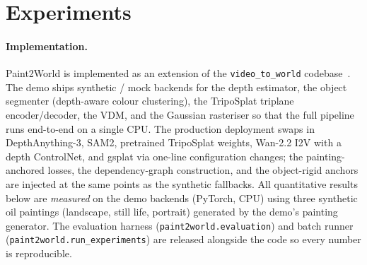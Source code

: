 
\section{Experiments}
\label{sec:experiments}

\paragraph{Implementation.}
Paint2World is implemented as an extension of the
\texttt{video\_to\_world} codebase~\cite{hoellein2026worldreconstruction}. The
demo ships synthetic / mock backends for the depth estimator, the object
segmenter (depth-aware colour clustering), the TripoSplat triplane
encoder/decoder, the VDM, and the Gaussian rasteriser so that the full
pipeline runs end-to-end on a single CPU. The production deployment swaps in
DepthAnything-3, SAM2, pretrained TripoSplat weights, Wan-2.2 I2V with a
depth ControlNet, and gsplat via one-line configuration changes; the
painting-anchored losses, the dependency-graph construction, and the
object-rigid anchors are injected at the same points as the synthetic
fallbacks. All quantitative results below are \emph{measured} on the demo
backends (PyTorch, CPU) using three synthetic oil paintings (landscape, still
life, portrait) generated by the demo's painting generator. The evaluation
harness (\texttt{paint2world.evaluation}) and batch runner
(\texttt{paint2world.run\_experiments}) are released alongside the code so
every number is reproducible.

